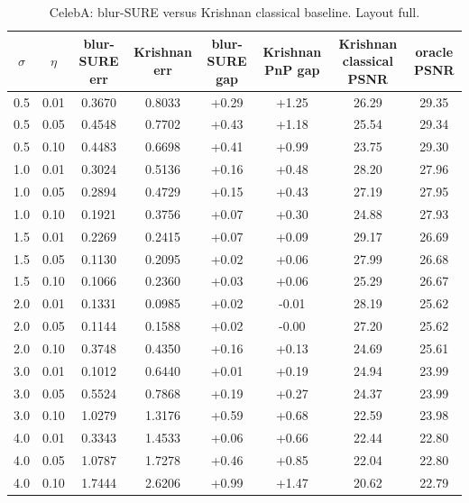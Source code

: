 \begin{table}[h]
\centering
\small
\begin{tabular}{cccccccc}
\toprule
$\sigma$ & $\eta$ & blur-SURE err & Krishnan err & blur-SURE gap & Krishnan PnP gap & Krishnan classical PSNR & oracle PSNR \\
\midrule
0.5 & 0.01 & 0.3670 & 0.8033 & +0.29 & +1.25 & 26.29 & 29.35 \\
0.5 & 0.05 & 0.4548 & 0.7702 & +0.43 & +1.18 & 25.54 & 29.34 \\
0.5 & 0.10 & 0.4483 & 0.6698 & +0.41 & +0.99 & 23.75 & 29.30 \\
1.0 & 0.01 & 0.3024 & 0.5136 & +0.16 & +0.48 & 28.20 & 27.96 \\
1.0 & 0.05 & 0.2894 & 0.4729 & +0.15 & +0.43 & 27.19 & 27.95 \\
1.0 & 0.10 & 0.1921 & 0.3756 & +0.07 & +0.30 & 24.88 & 27.93 \\
1.5 & 0.01 & 0.2269 & 0.2415 & +0.07 & +0.09 & 29.17 & 26.69 \\
1.5 & 0.05 & 0.1130 & 0.2095 & +0.02 & +0.06 & 27.99 & 26.68 \\
1.5 & 0.10 & 0.1066 & 0.2360 & +0.03 & +0.06 & 25.29 & 26.67 \\
2.0 & 0.01 & 0.1331 & 0.0985 & +0.02 & -0.01 & 28.19 & 25.62 \\
2.0 & 0.05 & 0.1144 & 0.1588 & +0.02 & -0.00 & 27.20 & 25.62 \\
2.0 & 0.10 & 0.3748 & 0.4350 & +0.16 & +0.13 & 24.69 & 25.61 \\
3.0 & 0.01 & 0.1012 & 0.6440 & +0.01 & +0.19 & 24.94 & 23.99 \\
3.0 & 0.05 & 0.5524 & 0.7868 & +0.19 & +0.27 & 24.37 & 23.99 \\
3.0 & 0.10 & 1.0279 & 1.3176 & +0.59 & +0.68 & 22.59 & 23.98 \\
4.0 & 0.01 & 0.3343 & 1.4533 & +0.06 & +0.66 & 22.44 & 22.80 \\
4.0 & 0.05 & 1.0787 & 1.7278 & +0.46 & +0.85 & 22.04 & 22.80 \\
4.0 & 0.10 & 1.7444 & 2.6206 & +0.99 & +1.47 & 20.62 & 22.79 \\
\bottomrule
\end{tabular}
\caption{CelebA: blur-SURE versus Krishnan classical baseline. Layout full.}
\label{tab:krishnan_compare_celeba}
\end{table}
